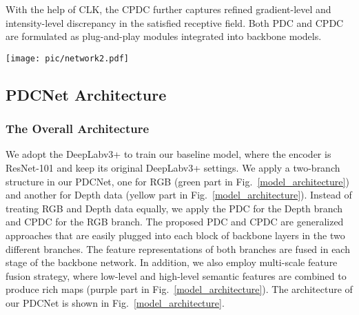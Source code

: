 \documentclass[lettersize,journal]{IEEEtran}
\begin{document}
With the help of CLK, the CPDC further captures refined gradient-level and intensity-level discrepancy in the satisfied receptive field. Both PDC and CPDC are formulated as plug-and-play modules integrated into backbone models. \fi



\iffalse As shown in Tab.~\ref{prop}, our proposed ELKA-DDCA combines the advantages of convolution and self-attention. The DDCA focuses on local structure in Depth data, while the ELKA-DDCA is utilized for RGB data. By augmenting the convolution kernel with a pixel difference term, PDC captures geometry with local receptive field. \fi



\begin{figure*}[t]
    \centering
\centering
        \centerline{
        \texttt{[image: pic/network2.pdf]}
        }
     \caption{The overview of PDCNet. The network is a two-branch structure, which consists of two ResNet-101 encoders. The CPDC and PDC are equipped after each block of ResNet-101 encoder in the RGB branch and Depth branch, respectively. During training, output feature maps of RGB layer and Depth layer are fused through a ECF module and then fed into the next stage.}
\label{model_architecture}
\end{figure*}

\subsection{PDCNet Architecture}
\subsubsection{The Overall Architecture}
We adopt the DeepLabv3+ \cite{chen2018encoder} to train our baseline model, where the encoder is ResNet-101 \cite{he2016deep} and keep its original DeepLabv3+ settings. We apply a two-branch structure in our PDCNet, one for RGB (green part in Fig.~\ref{model_architecture}) and another for Depth data (yellow part in Fig.~\ref{model_architecture}). Instead of treating RGB and Depth data equally, we apply the PDC for the Depth branch and CPDC for the RGB branch. The proposed PDC and CPDC are generalized approaches that are easily plugged into each block of backbone layers in the two different branches. The feature representations of both branches are fused in each stage of the backbone network. In addition, we also employ multi-scale feature fusion strategy, where low-level and high-level semantic features are combined to produce rich maps (purple part in Fig.~\ref{model_architecture}). The architecture of our PDCNet is shown in Fig.~\ref{model_architecture}.
\end{document}
